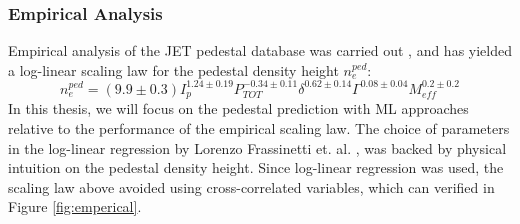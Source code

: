 \documentclass[a4paper, twoside, final, 12pt]{article}
\begin{document}
\subsubsection{Empirical Analysis}

Empirical analysis of the JET pedestal database was carried out \cite{Frassinetti_2020}, and has yielded a log-linear scaling law for the pedestal density height $n_e^{ped}$:
\begin{equation} \label{eq:scaling}
	n_e^{ped} = (9.9 \pm 0.3) I_p^{1.24 \pm 0.19} P_{TOT}^{-0.34 \pm 0.11} \delta^{0.62 \pm 0.14} \Gamma^{ 0.08 \pm 0.04} M_{eff}^{0.2 \pm 0.2}
\end{equation}
In this thesis, we will focus on the pedestal prediction with ML approaches relative to the performance of the empirical scaling law.
The choice of parameters in the log-linear regression by Lorenzo Frassinetti et. al. \cite{Frassinetti_2020}, was backed by physical intuition on the pedestal density height. Since log-linear regression was used, the scaling law above avoided using cross-correlated variables, which can verified in Figure \ref{fig:emperical}. 
\end{document}
